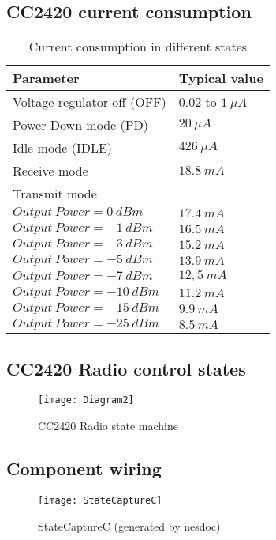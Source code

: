 \documentclass[a4paper,11pt]{article}
\begin{document}
  \subsection*{CC2420 current consumption}

	\begin{table}[h]
	\begin{tabular}{ | p{8cm} | p{3cm} |}
		\hline
		\bf{Parameter} & \bf{Typical value} \\
		\hline
		\hline
		Voltage regulator off (OFF) & $0.02$ to $1\ \mu A$ \\
		\hline
		Power Down mode (PD) & $20\ \mu A$ \\
		\hline
		Idle mode (IDLE) & $426\ \mu A$ \\
		\hline
		Receive mode & $18.8\ mA$ \\
		\hline
		Transmit mode & \\
		$Output\ Power = 0\ dBm $ & $17.4\ mA$ \\
		$Output\ Power = -1\ dBm $ & $16.5\ mA$ \\
		$Output\ Power = -3\ dBm $ & $15.2\ mA$ \\
		$Output\ Power = -5\ dBm $ & $13.9\ mA$ \\
		$Output\ Power = -7\ dBm $ & $12,5\ mA$ \\
		$Output\ Power = -10\ dBm $ & $11.2\ mA$ \\
		$Output\ Power = -15\ dBm $ & $9.9\ mA$ \\
		$Output\ Power = -25\ dBm $ & $8.5\ mA$ \\
		\hline
	\end{tabular}
	\caption{Current consumption in different states}
	\end{table}

  \subsection*{CC2420 Radio control states}

  \begin{figure}[h]
    \centering
    \texttt{[image: Diagram2]}
    \caption{CC2420 Radio state machine}
    \label{fig:statemachine}
  \end{figure}

  \subsection*{Component wiring}


  \begin{figure}[h]
    \centering
    \texttt{[image: StateCaptureC]}
    \caption{StateCaptureC (generated by nesdoc)}
    \label{fig:statecapturec}
  \end{figure}
\end{document}
